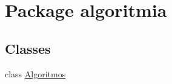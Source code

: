 \hypertarget{namespacealgoritmia}{}\section{Package algoritmia}
\label{namespacealgoritmia}
\subsection*{Classes}
\begin{DoxyCompactItemize}
\item 
class \mbox{\hyperlink{classalgoritmia_1_1_algoritmos}{Algoritmos}}
\end{DoxyCompactItemize}
